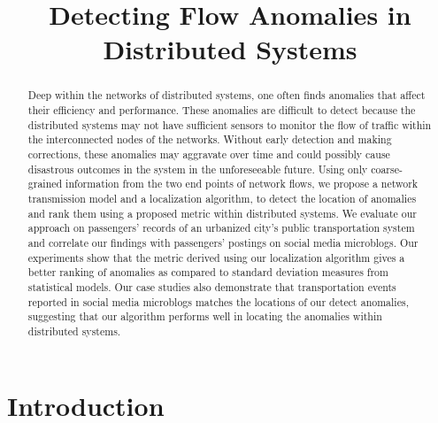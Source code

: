 \documentclass[conference]{IEEEtran.1.8}
\begin{document}
\title{Detecting Flow Anomalies in Distributed Systems}

\author{
	\and
	\and
}

\maketitle

\begin{abstract}
Deep within the networks of distributed systems, one often finds anomalies that affect their efficiency and performance. These anomalies are difficult to detect because the distributed systems may not have sufficient sensors to monitor the flow of traffic within the interconnected nodes of the networks. Without early detection and making corrections, these anomalies may aggravate over time and could possibly cause disastrous outcomes in the system in the unforeseeable future. Using only coarse-grained information from the two end points of network flows, we propose a network transmission model and a localization algorithm, to detect the location of anomalies and rank them using a proposed metric within distributed systems. We evaluate our approach on passengers' records of an urbanized city's public transportation system and correlate our findings with passengers' postings on social media microblogs. Our experiments show that the metric derived using our localization algorithm gives a better ranking of anomalies as compared to standard deviation measures from statistical models. Our case studies also demonstrate that transportation events reported in social media microblogs matches the locations of our detect anomalies, suggesting that our algorithm performs well in locating the anomalies within distributed systems.
\end{abstract}

\section{Introduction}
\label{sec:intro}
\end{document}
